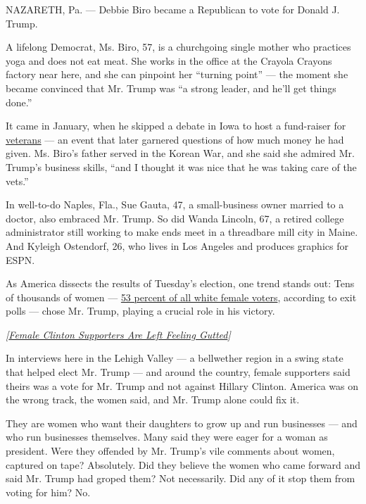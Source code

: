 NAZARETH, Pa. --- Debbie Biro became a Republican to vote for Donald J.
Trump.

A lifelong Democrat, Ms. Biro, 57, is a churchgoing single mother who
practices yoga and does not eat meat. She works in the office at the
Crayola Crayons factory near here, and she can pinpoint her ``turning
point'' --- the moment she became convinced that Mr. Trump was ``a
strong leader, and he'll get things done.''

It came in January, when he skipped a debate in Iowa to host a
fund-raiser for
\href{http://www.nytimes3xbfgragh.onion/2016/11/03/us/politics/donald-trump-veterans.html}{veterans}
--- an event that later garnered questions of how much money he had
given. Ms. Biro's father served in the Korean War, and she said she
admired Mr. Trump's business skills, ``and I thought it was nice that he
was taking care of the vets.''

In well-to-do Naples, Fla., Sue Gauta, 47, a small-business owner
married to a doctor, also embraced Mr. Trump. So did Wanda Lincoln, 67,
a retired college administrator still working to make ends meet in a
threadbare mill city in Maine. And Kyleigh Ostendorf, 26, who lives in
Los Angeles and produces graphics for ESPN.

As America dissects the results of Tuesday's election, one trend stands
out: Tens of thousands of women ---
\href{http://www.nytimes3xbfgragh.onion/2016/12/01/us/politics/white-women-helped-elect-donald-trump.html}{53
percent of all white female voters}, according to exit polls --- chose
Mr. Trump, playing a crucial role in his victory.

\emph{{[}}\href{http://www.nytimes3xbfgragh.onion/2016/11/11/us/politics/female-clinton-supporters-are-left-feeling-gutted.html}{\emph{Female
Clinton Supporters Are Left Feeling Gutted}}\emph{{]}}

In interviews here in the Lehigh Valley --- a bellwether region in a
swing state that helped elect Mr. Trump --- and around the country,
female supporters said theirs was a vote for Mr. Trump and not against
Hillary Clinton. America was on the wrong track, the women said, and Mr.
Trump alone could fix it.

They are women who want their daughters to grow up and run businesses
--- and who run businesses themselves. Many said they were eager for a
woman as president. Were they offended by Mr. Trump's vile comments
about women, captured on tape? Absolutely. Did they believe the women
who came forward and said Mr. Trump had groped them? Not necessarily.
Did any of it stop them from voting for him? No.

